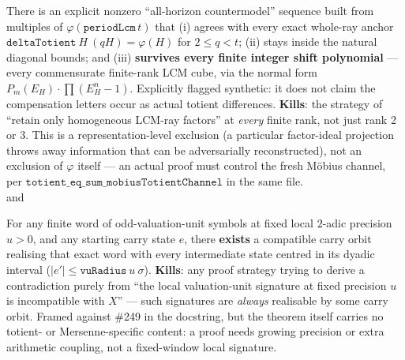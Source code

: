 \begin{obs}\label{prop:B4b-kill}
There is an explicit nonzero ``all-horizon countermodel'' sequence built from multiples of
$\varphi(\mathtt{periodLcm}\,t)$ that (i) agrees with every exact whole-ray anchor
$\mathtt{deltaTotient}\ H\ (qH)=\varphi(H)$ for $2\le q<t$; (ii) stays inside the natural diagonal
bounds; and (iii) \textbf{survives every finite integer shift polynomial} — every commensurate
finite-rank LCM cube, via the normal form $P_m(E_H)\cdot\prod(E_H^n-1)$. Explicitly flagged
synthetic: it does not claim the compensation letters occur as actual totient differences.
\textbf{Kills}: the strategy of ``retain only homogeneous LCM-ray factors'' at \emph{every} finite
rank, not just rank 2 or 3. This is a representation-level exclusion (a particular factor-ideal
projection throws away information that can be adversarially reconstructed), not an exclusion of
$\varphi$ itself — an actual proof must control the fresh Möbius channel, per
$\mathtt{totient\_eq\_sum\_mobiusTotientChannel}$ in the same file.
\ \ \\
and 
\end{obs}

\begin{obs}\label{prop:B5-kill}
For any finite word of odd-valuation-unit symbols at fixed local $2$-adic precision $u>0$, and any
starting carry state $e$, there \textbf{exists} a compatible carry orbit realising that exact word
with every intermediate state centred in its dyadic interval ($|e'|\le\mathtt{vuRadius}\ u\ \sigma$).
\textbf{Kills}: any proof strategy trying to derive a contradiction purely from ``the local
valuation-unit signature at fixed precision $u$ is incompatible with $X$'' — such signatures are
\emph{always} realisable by some carry orbit. Framed against \#249 in the docstring, but the
theorem itself carries no totient- or Mersenne-specific content: a proof needs growing precision
or extra arithmetic coupling, not a fixed-window local signature.
\ \ \\
\end{obs}

